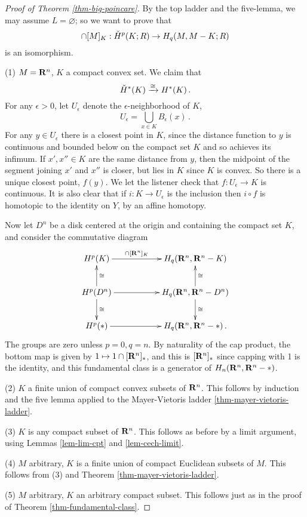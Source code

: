 \begin{proof}[Proof of Theorem \ref{thm-big-poincare}]
By the top ladder and the five-lemma, we may assume $L=\varnothing$; so we 
want to prove that 
\[
\cap[M]_K:\check{H}^p(K;R)\to H_q(M,M-K;R)
\]
is an isomorphism. 

(1) $M=\mathbf R^n$, $K$ a compact convex set. We claim that 
\[
\check{H}^*(K)\xrightarrow{\cong} H^*(K)\,.
\]
For any $\epsilon>0$, let $U_\epsilon$
denote the $\epsilon$-neighborhood of $K$, 
\[
U_\epsilon=\bigcup_{x\in K}B_\epsilon(x)\,.
\]
For any $y\in U_\epsilon$ there is a closest point in $K$, since the
distance function to $y$ is continuous and bounded below on the compact set 
$K$ and so achieves its infimum. If $x',x''\in K$ are the same distance 
from $y$, then the midpoint of the segment joining $x'$ and $x''$ is closer,
but lies in $K$ since $K$ is convex. So there is a unique closest point,
$f(y)$. We let the listener check that $f:U_\epsilon\to K$ is continuous. 
It is also clear that if $i:K\to U_\epsilon$ is the inclusion then 
$i\circ f$ is homotopic to the identity on $Y$, by an affine homotopy. 

Now let $D^n$ be a disk centered at the origin and containing the compact
set $K$, and consider the commutative diagram
\[
\xymatrix{
H^p(K) \ar[rr]^-{\cap[\RR^n]_K} && H_q(\RR^n,\RR^n-K) \\
H^p(D^n) \ar[u]_\cong \ar[rr] \ar[d]^\cong && 
H_q(\RR^n,\RR^n-D^n) \ar[u]_\cong \ar[d]^\cong \\
H^p(\ast) \ar[rr] && H_q(\RR^n,\RR^n-\ast) \,.
}\]
The groups are zero unless $p=0,q=n$. 
By naturality of the cap product, the bottom map is given by 
$1\mapsto1\cap[\mathbf R^n]_\ast$, and this is $[\mathbf R^n]_\ast$ since capping with 
1 is the identity, and this fundamental class is a generator of
$H_n(\mathbf R^n,\mathbf R^n-\ast)$. 

(2) $K$ a finite union of compact convex subsets of $\mathbf R^n$. 
This follows by induction and the five lemma applied to the Mayer-Vietoris
ladder \ref{thm-mayer-vietoris-ladder}.

(3) $K$ is any compact subset of $\mathbf R^n$. This follows as before by a limit
argument, using Lemmas \ref{lem-lim-cpt} and \ref{lem-cech-limit}.

(4) $M$ arbitrary, $K$ is a finite union of compact Euclidean subsets of $M$.
This follows from (3) and Theorem \ref{thm-mayer-vietoris-ladder}.

(5) $M$ arbitrary, $K$ an arbitrary compact subset. This follows just as in
the proof of Theorem \ref{thm-fundamental-class}. 
\end{proof}

